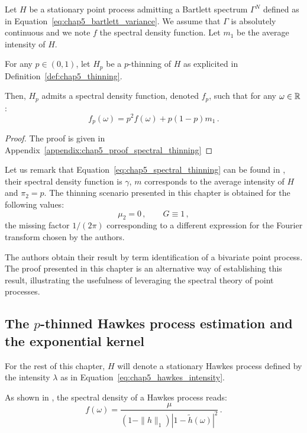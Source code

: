 \begin{proposition}\label{prop:chap5_spectral_thinning}
    Let $H$ be a stationary point process admitting a Bartlett spectrum $\Gamma^N$ defined as in Equation~\eqref{eq:chap5_bartlett_variance}.
    We assume that $\Gamma$ is absolutely continuous and we note $f$ the spectral density function. 
    Let $m_1$ be the average intensity of $H$.

    For any $p\in(0,1)$, let $H_p$ be a $p$-thinning of $H$ as explicited in Definition~\ref{def:chap5_thinning}.

    Then, $H_p$ admits a spectral density function, denoted $f_p$, such that for any $\omega\in{\mathbb R}$:
    \begin{equation}\label{eq:chap5_spectral_thinning}
        f_p(\omega) = p^2 f(\omega) + p(1-p)m_1\,.
    \end{equation}

\end{proposition}

\begin{proof}
    The proof is given in Appendix~\ref{appendix:chap5_proof_spectral_thinning}
\end{proof}

    Let us remark that Equation~\eqref{eq:chap5_spectral_thinning} can be found in \textcite[Equation 8.3.5]{DaleyV1},
    their spectral density function is $\gamma$, $m$ corresponds to the average intensity of $H$ and $\pi_2 = p$.
    The thinning scenario presented in this chapter is obtained for the following values:
    \[\mu_2 = 0\,, \qquad G\equiv 1\,,\]
    the missing factor $1/(2\pi)$ corresponding to a different expression for the Fourier transform chosen by the authors.

    The authors obtain their result by term identification of a bivariate point process. 
    The proof presented in this chapter is an alternative way of establishing this result,
    illustrating the usefulness of leveraging the spectral theory of point processes.

\subsection{The $p$-thinned Hawkes process estimation and the exponential kernel}

    For the rest of this chapter, 
    $H$ will denote a stationary Hawkes process defined by the intensity $\lambda$ as in Equation~\eqref{eq:chap5_hawkes_intensity}.

    As shown in \textcite{Hawkes1971}, the spectral density of a Hawkes process reads:
    \[f(\omega) = \frac{\mu}{(1-\|h\|_1)|1-\tilde h(\omega)|^2}\,.\]


